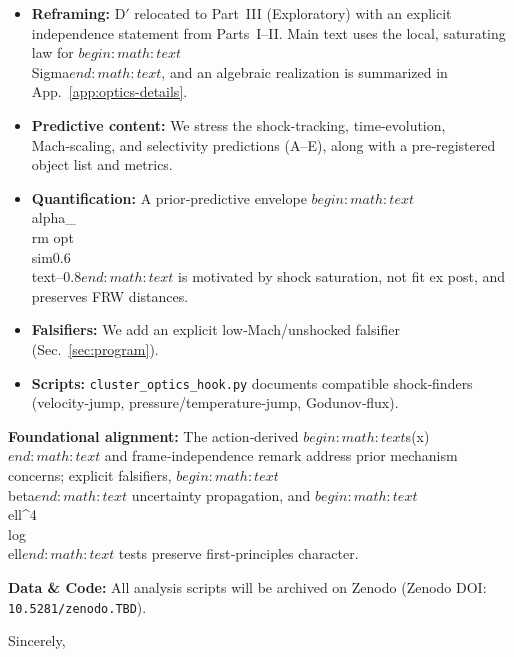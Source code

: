 \documentclass[aps,prd,onecolumn,superscriptaddress,nofootinbib]{revtex4-2}
\def\alpha{alpha}%
\def\alpha_M{alphaM}%
\newcommand{\zenododoi}{10.5281/zenodo.TBD} %
\begin{document}
\begin{itemize}
  \item \textbf{Reframing:} D$'$ relocated to Part~III (Exploratory) with an explicit independence statement from Parts~I–II. Main text uses the local, saturating law for $begin:math:text$\\Sigma$end:math:text$, and an algebraic realization is summarized in App.~\ref{app:optics-details}.
  \item \textbf{Predictive content:} We stress the shock‑tracking, time‑evolution, Mach‑scaling, and selectivity predictions (A–E), along with a pre‑registered object list and metrics.
  \item \textbf{Quantification:} A prior‑predictive envelope $begin:math:text$\\alpha_{\\rm opt}\\sim0.6\\text{--}0.8$end:math:text$ is motivated by shock saturation, not fit ex post, and preserves FRW distances.
  \item \textbf{Falsifiers:} We add an explicit low‑Mach/unshocked falsifier (Sec.~\ref{sec:program}).
  \item \textbf{Scripts:} \texttt{cluster\_optics\_hook.py} documents compatible shock‑finders (velocity‑jump, pressure/temperature‑jump, Godunov‑flux).
\end{itemize}

\noindent \textbf{Foundational alignment:} The action‑derived $begin:math:text$s(x)$end:math:text$ and frame‑independence remark address prior mechanism concerns; explicit falsifiers, $begin:math:text$\\beta$end:math:text$ uncertainty propagation, and $begin:math:text$\\ell^4\\log\\ell$end:math:text$ tests preserve first‑principles character.

\noindent \textbf{Data \& Code:} All analysis scripts will be archived on Zenodo (Zenodo DOI: \texttt{\zenododoi}). 

Sincerely,\\
[Authors]
\fi
\end{document}
